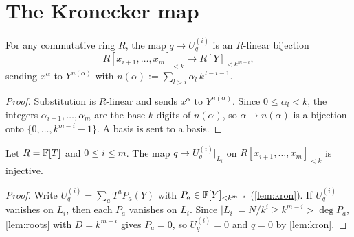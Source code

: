 \section{The Kronecker map}

\begin{lemma}\label{lem:kron}
For any commutative ring $R$, the map $q\mapsto U^{(i)}_q$ is an $R$-linear bijection
\[
R[x_{i+1},\dots,x_m]_{<k}\longrightarrow R[Y]_{<k^{m-i}},
\]
sending $x^\alpha$ to $Y^{n(\alpha)}$ with $n(\alpha):=\sum_{l>i}\alpha_l\,k^{\,l-i-1}$.
\end{lemma}

\begin{proof}
Substitution is $R$-linear and sends $x^\alpha$ to $Y^{n(\alpha)}$. Since $0\le\alpha_l<k$,
the integers $\alpha_{i+1},\dots,\alpha_m$ are the base-$k$ digits of $n(\alpha)$, so
$\alpha\mapsto n(\alpha)$ is a bijection onto $\{0,\dots,k^{m-i}-1\}$. A basis is sent to a
basis.
\end{proof}

\begin{lemma}\label{lem:inj}
Let $R=\mathbb{F}[T]$ and $0\le i\le m$. The map $q\mapsto U^{(i)}_q\big|_{L_i}$ on
$R[x_{i+1},\dots,x_m]_{<k}$ is injective.
\end{lemma}

\begin{proof}
Write $U^{(i)}_q=\sum_a T^aP_a(Y)$ with $P_a\in\mathbb{F}[Y]_{<k^{m-i}}$ (\cref{lem:kron}). If
$U^{(i)}_q$ vanishes on $L_i$, then each $P_a$ vanishes on $L_i$. Since
$|L_i|=N/k^i\ge k^{m-i}>\deg P_a$, \cref{lem:roots} with $D=k^{m-i}$ gives $P_a=0$, so
$U^{(i)}_q=0$ and $q=0$ by \cref{lem:kron}.
\end{proof}
